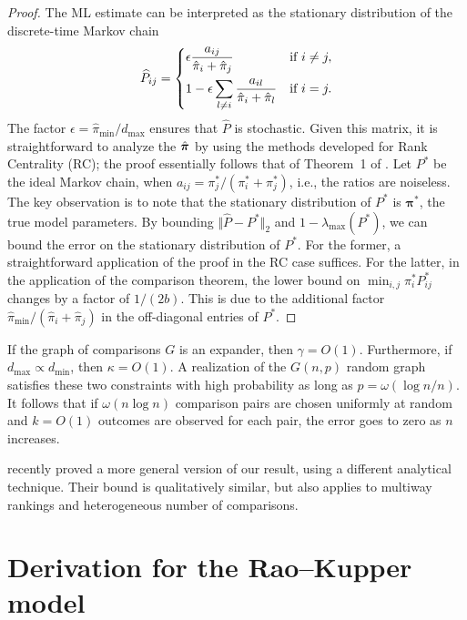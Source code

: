 \begin{proof}
The ML estimate can be interpreted as the stationary distribution of the discrete-time Markov chain
\begin{align}
\label{fix:eq:mlchain}
  \widehat{P}_{ij} =
  \begin{dcases}
    \epsilon \frac{a_{ij}}{\hat{\pi}_i + \hat{\pi}_j}                    & \text{if } i \ne j, \\
    1 - \epsilon \sum_{l \ne i} \frac{a_{il}}{\hat{\pi}_i + \hat{\pi}_l} & \text{if } i = j.
  \end{dcases}
\end{align}
The factor $\epsilon = \hat{\pi}_{\min} / d_{\max}$ ensures that $\widehat{P}$ is stochastic.
Given this matrix, it is straightforward to analyze the $\hat{\bm{\pi}}$ by using the methods developed for Rank Centrality (RC);
the proof essentially follows that of Theorem~1 of \citet{negahban2017rank}.
Let $P^*$ be the ideal Markov chain, when  $a_{ij} = \pi^*_j / (\pi^*_i + \pi^*_j)$, i.e., the ratios are noiseless.
The key observation is to note that the stationary distribution of $P^*$ is $\bm{\pi}^*$, the true model parameters.
By bounding $\Vert \widehat{P} - P^* \Vert_2$ and $1 - \lambda_{\max}(P^*)$, we can bound the error on the stationary distribution of $P^*$.
For the former, a straightforward application of the proof in the RC case suffices.
For the latter, in the application of the comparison theorem, the lower bound on $\min_{i,j} \pi^*_i P^*_{ij}$ changes by a factor of $1/(2b)$.
This is due to the additional factor $\hat{\pi}_{\min} / (\hat{\pi}_i + \hat{\pi}_j)$ in the off-diagonal entries of $P^*$.
\end{proof}

If the graph of comparisons $G$ is an expander, then $\gamma = O(1)$.
Furthermore, if $d_{\max} \propto d_{\min}$, then $\kappa = O(1)$.
A realization of the $G(n, p)$ random graph satisfies these two constraints with high probability as long as $p = \omega(\log n / n)$.
It follows that if $\omega(n \log n)$ comparison pairs are chosen uniformly at random and $k = O(1)$ outcomes are observed for each pair, the error goes to zero as $n$ increases.

\citet{hajek2014minimax} recently proved a more general version of our result, using a different analytical technique.
Their bound is qualitatively similar, but also applies to multiway rankings and heterogeneous number of comparisons.

\section{Derivation for the Rao--Kupper model}

